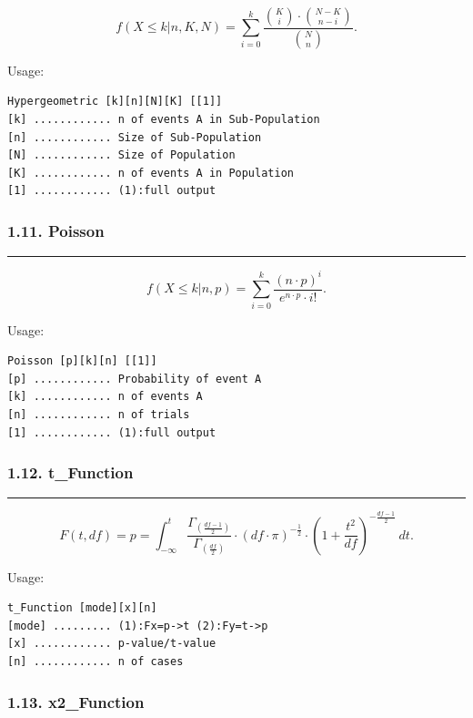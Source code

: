 \documentclass[
]{article}
\begin{document}
\[f\left( X \leq k|n,K,N \right) = \sum_{i = 0}^{k}\frac{\binom{K}{i} \cdot \binom{N - K}{n - i}}{\binom{N}{n}}.\]

Usage:

\begin{verbatim}
Hypergeometric [k][n][N][K] [[1]]
[k] ............ n of events A in Sub-Population
[n] ............ Size of Sub-Population
[N] ............ Size of Population
[K] ............ n of events A in Population
[1] ............ (1):full output
\end{verbatim}

\hypertarget{poisson}{%
\subsubsection{1.11. Poisson}\label{poisson}}

\begin{center}\rule{0.5\linewidth}{0.5pt}\end{center}

\[f\left( X \leq k|n,p \right) = \sum_{i = 0}^{k}\frac{(n \cdot p)^{i}}{e^{n \cdot p} \cdot i!}.\]

Usage:

\begin{verbatim}
Poisson [p][k][n] [[1]]
[p] ............ Probability of event A
[k] ............ n of events A
[n] ............ n of trials
[1] ............ (1):full output
\end{verbatim}

\hypertarget{t_function}{%
\subsubsection{1.12. t\_Function}\label{t_function}}

\begin{center}\rule{0.5\linewidth}{0.5pt}\end{center}

\[F(t,df) = p = \int_{- \infty}^{t}\frac{\Gamma_{\left( \frac{df - 1}{2} \right)}}{\Gamma_{\left( \frac{df}{2} \right)}} \cdot (df \cdot \pi)^{- \frac{1}{2}} \cdot \left( 1 + \frac{t^{2}}{df} \right)^{- \frac{df - 1}{2}}\ dt.\]

Usage:

\begin{verbatim}
t_Function [mode][x][n]
[mode] ......... (1):Fx=p->t (2):Fy=t->p
[x] ............ p-value/t-value
[n] ............ n of cases
\end{verbatim}

\hypertarget{x2_function}{%
\subsubsection{1.13. x2\_Function}\label{x2_function}}
\end{document}
